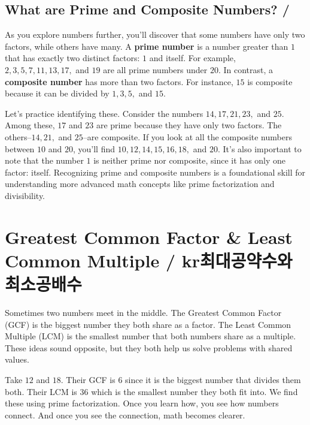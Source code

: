 \subsection{What are Prime and Composite Numbers? / }

As you explore numbers further, you'll discover that some numbers have only two
factors, while others have many. A \textbf{prime number} is a number greater than
\(1\) that has exactly two distinct factors: \(1\) and itself. For example, \(2,
3, 5, 7, 11, 13, 17,\) and \(19\) are all prime numbers under \(20\). In
contrast, a \textbf{composite number} has more than two factors. For instance,
\(15\) is composite because it can be divided by \(1, 3, 5,\) and \(15\).

Let's practice identifying these. Consider the numbers \(14, 17, 21, 23,\) and
\(25\). Among these, \(17\) and \(23\) are prime because they have only two
factors. The others--\(14, 21,\) and \(25\)--are composite. If you look at all
the composite numbers between \(10\) and \(20\), you'll find \(10, 12, 14, 15,
16, 18,\) and \(20\). It's also important to note that the number \(1\) is
neither prime nor composite, since it has only one factor: itself. Recognizing
prime and composite numbers is a foundational skill for understanding more
advanced math concepts like prime factorization and divisibility.

















\newpage
\section{Greatest Common Factor \& Least Common Multiple / kr{최대공약수와 최소공배수}}

Sometimes two numbers meet in the middle. The Greatest Common Factor (GCF) is the
biggest number they both share as a factor. The Least Common Multiple (LCM) is the
smallest number that both numbers share as a multiple. These ideas sound opposite,
but they both help us solve problems with shared values.

Take \(12\) and \(18\). Their GCF is \(6\) since it is the biggest number that
divides them both. Their LCM is \(36\) which is the smallest number they both fit
into. We find these using prime factorization. Once you learn how, you see how
numbers connect. And once you see the connection, math becomes clearer.

